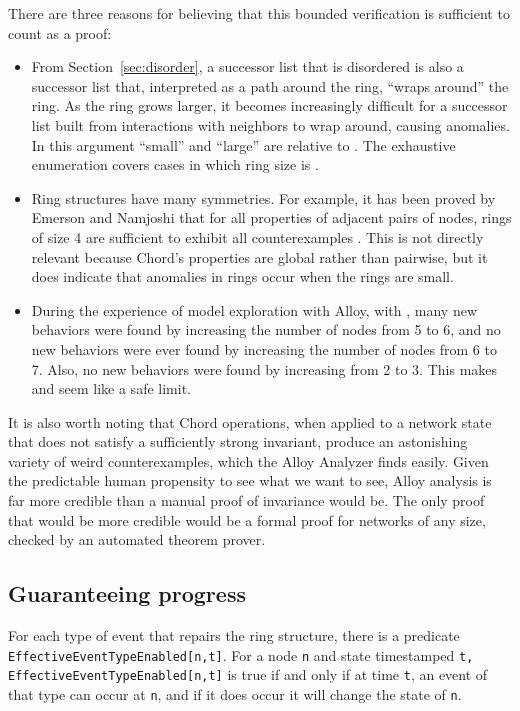 \documentclass[conference]{IEEEtran}
\begin{document}
There are three reasons for believing that this bounded verification
is sufficient to count as a proof:
\begin{itemize}
\item
From Section~\ref{sec:disorder}, a successor list that is disordered
is also a successor list that, interpreted as a path around the ring,
``wraps around'' the ring.
As the ring grows larger, it becomes increasingly difficult for a
successor list built from interactions with neighbors to wrap around,
causing anomalies.
In this argument ``small'' and ``large'' are relative to .
The exhaustive enumeration covers cases in which ring size is
.
\item
Ring structures have many symmetries.
For example, it has been proved by Emerson and Namjoshi that for all
properties of adjacent pairs of nodes, rings of size 4 are sufficient
to exhibit all counterexamples \cite{cutoff}.
This is not directly relevant because Chord's properties are global
rather than pairwise, but it does indicate that anomalies in rings 
occur when the rings are small.
\item
During the experience of model exploration with Alloy,
with ,
many new behaviors were found
by increasing the number of nodes from 5 to 6, and no new behaviors were
ever found by increasing the number of nodes from 6 to 7.
Also, no new behaviors were found by increasing  from 2 to 3.
This makes  and  seem like a safe limit.
\end{itemize}

It is also worth noting that Chord operations, when applied to a network
state that does not satisfy a sufficiently strong invariant, produce 
an astonishing variety of weird counterexamples, which the Alloy
Analyzer finds easily.
Given the predictable human
propensity to see what we want to see, Alloy analysis
is far more credible than a manual proof of invariance would be.
The only proof that would be more credible would be a formal proof
for networks of any size, checked by an automated theorem prover.

\subsection{Guaranteeing progress}

For each type of event that repairs the ring structure,
there is a predicate
\small
{\tt EffectiveEventTypeEnabled[n,t]}.
\normalsize
For a node 
\small
{\tt n}
\normalsize
and state timestamped
\small
{\tt t, EffectiveEventTypeEnabled[n,t]} 
\normalsize
is true if and only if at time
\small
{\tt t},
\normalsize
an event of that type can occur at 
\small
{\tt n},
\normalsize
and if it does occur
it will change the state of
\small
{\tt n}.
\normalsize
\end{document}
